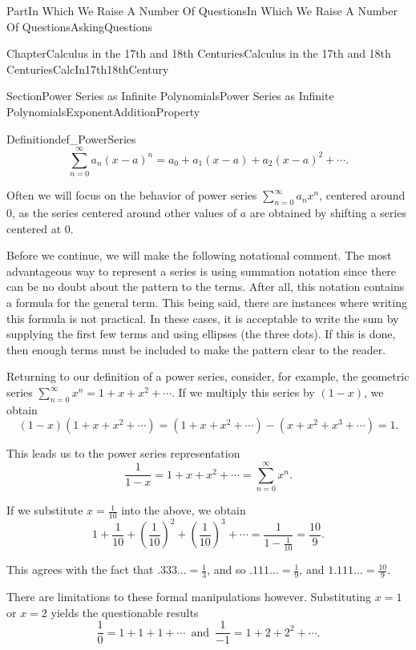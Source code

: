 \documentclass[oneside,10pt,]{book}
\numberwithin{equation}{part}
\begin{document}
\begin{partptx}{Part}{In Which We Raise A Number Of Questions}{}{In Which We Raise A Number Of Questions}{}{}{AskingQuestions}
\begin{chapterptx}{Chapter}{Calculus in the 17th and 18th Centuries}{}{Calculus in the 17th and 18th Centuries}{}{}{CalcIn17th18thCentury}
\begin{sectionptx}{Section}{Power Series as Infinite Polynomials}{}{Power Series as Infinite Polynomials}{}{}{ExponentAdditionProperty}
\begin{definition}{Definition}{}{def_PowerSeries}
\begin{equation*}
\sum_{n=0}^\infty a_n(x-a)^n=a_0+a_1(x-a)+a_2(x-a)^2+\cdots\text{.}
\end{equation*}
%
\par
Often we will focus on the behavior of power series \(\sum_{n=0}^\infty a_nx^n\), centered around \(0\), as the series centered around other values of \(a\) are obtained by shifting a series centered at \(0\).%
\end{definition}
Before we continue, we will make the following notational comment.  The most advantageous way to represent a series is using summation notation since there can be no doubt about the pattern to the terms.  After all, this notation contains a formula for the general term.  This being said, there are instances where writing this formula is not practical.  In these cases, it is acceptable to write the sum by supplying the first few terms and using ellipses (the three dots).  If this is done, then enough terms must be included to make the pattern clear to the reader.%
\par
{} Returning to our definition of a power series, consider, for example, the geometric series \(\sum_{n=0}^\infty
x^n=1+x+x^2+\cdots\).  If we multiply this series by \((1-x)\), we obtain%
\begin{equation*}
(1-x)(1+x+x^2+\cdots)=(1+x+x^2+\cdots)-(x+x^2+x^3+\cdots)=1\text{.}
\end{equation*}
%
\par
This leads us to the power series representation%
\begin{equation*}
\frac{1}{1-x}=1+x+x^2+\cdots=\sum_{n=0}^\infty x^n \text{.}
\end{equation*}
%
\par
If we substitute \(x=\frac{1}{10}\) into the above, we obtain%
\begin{equation*}
1+\frac{1}{10}+\left(\frac{1}{10}\right)^2+\left(\frac{1}{10}\right)^3+
\cdots=\frac{1}{1-\frac{1}{10}}=\frac{10}{9} \text{.}
\end{equation*}
%
\par
This agrees with the fact that \(.333\ldots=\frac{1}{3}\), and so \(.111\ldots=\frac{1}{9}\), and \(1.111\ldots=\frac{10}{9}\).%
\par
There are limitations to these formal manipulations however. Substituting \(x=1\) or \(x=2\) yields the questionable results%
\begin{equation*}
\frac{1}{0}=1+1+1+\cdots\,\text{  and  }  \,\frac{1}{-1}=1+2+2^2+\cdots\text{.}

\end{equation*}
\end{sectionptx}
\end{chapterptx}
\end{partptx}
\end{document}
